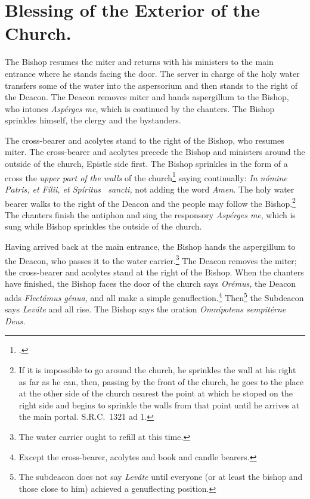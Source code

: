\documentclass[letterpaper]{report}
\newcommand\src{\textsc{S.R.C.}}
\begin{document}
{    \section{Blessing of the Exterior of the Church.}

    \rubric The Bishop resumes the miter and returns with his ministers to the
    main entrance where he stands facing the door. The server in charge of the
    holy water transfers some of the water into the aspersorium and then stands
    to the right of the Deacon. The Deacon removes miter and hands aspergillum
    to the Bishop, who intones \textit{Asp\'erges me}, which is continued by
    the chanters. The Bishop sprinkles himself, the clergy and the bystanders.

    \rubric The cross-bearer and acolytes stand to the right of the Bishop, who
    resumes miter. The cross-bearer and acolytes precede the Bishop and
    ministers around the outside of the church, Epistle side first. The Bishop
    sprinkles in the form of a cross the \textit{upper part of the walls} of
    the church\footcite[The procession walks around and Bishop sprinkles the
    cemetery also if it be adjacent.][n. 41, p. 44.]{consecranda} saying
    continually: \textit{In nómine Pa\cross tris, et Fí\cross lii, et Spíritus
    \cross\ sancti,} not adding the word \textit{Amen}. The holy water bearer
    walks to the right of the Deacon and the people may follow the
    Bishop.\footnote{If it is impossible to go around the church, he sprinkles
    the wall at his right as far as he can, then, passing by the front of the
    church, he goes to the place at the other side of the church nearest the
    point at which he stoped on the right side and begins to sprinkle the walls
    from that point until he arrives at the main portal. \src\ 1321 ad 1.} The
    chanters finish the antiphon and sing the responsory \textit{Asp\'erges
    me}, which is sung while Bishop sprinkles the outside of the church.

    \rubric Having arrived back at the main entrance, the Bishop hands the
    aspergillum to the Deacon, who passes it to the water carrier.\footnote{The
    water carrier ought to refill at this time.} The Deacon removes the miter;
    the cross-bearer and acolytes stand at the right of the Bishop. When
    the chanters have finished, the Bishop faces the door of the church says
    \textit{Orémus,} the Deacon adds \textit{Flectámus génua,} and all make a
    simple genuflection.\footnote{Except the cross-bearer, acolytes and book
    and candle bearers.} Then\footnote{The subdeacon does not say
    \textit{Leváte} until everyone (or at least the bishop and those close to
    him) achieved a genuflecting position.} the Subdeacon says \textit{Leváte}
    and all rise. The Bishop says the oration \textit{Omnípotens sempitérne
    Deus.}

}
\end{document}
